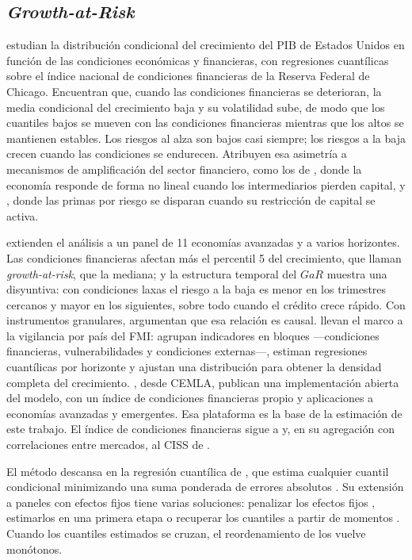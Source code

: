 \subsection{\textit{Growth-at-Risk}}

\citet{ABG2019b} estudian la distribución condicional del crecimiento del PIB de Estados Unidos en función de las condiciones económicas y financieras, con regresiones cuantílicas sobre el índice nacional de condiciones financieras de la Reserva Federal de Chicago. Encuentran que, cuando las condiciones financieras se deterioran, la media condicional del crecimiento baja y su volatilidad sube, de modo que los cuantiles bajos se mueven con las condiciones financieras mientras que los altos se mantienen estables. Los riesgos al alza son bajos casi siempre; los riesgos a la baja crecen cuando las condiciones se endurecen. Atribuyen esa asimetría a mecanismos de amplificación del sector financiero, como los de \citet{BrunnermeierSannikov2014}, donde la economía responde de forma no lineal cuando los intermediarios pierden capital, y \citet{HeKrishnamurthy2013}, donde las primas por riesgo se disparan cuando su restricción de capital se activa.

\citet{AdrianEtAl2022} extienden el análisis a un panel de 11 economías avanzadas y a varios horizontes. Las condiciones financieras afectan más el percentil 5 del crecimiento, que llaman \textit{growth-at-risk}, que la mediana; y la estructura temporal del $GaR$ muestra una disyuntiva: con condiciones laxas el riesgo a la baja es menor en los trimestres cercanos y mayor en los siguientes, sobre todo cuando el crédito crece rápido. Con instrumentos granulares, argumentan que esa relación es causal. \citet{PrasadEtAl2019} llevan el marco a la vigilancia por país del FMI: agrupan indicadores en bloques ---condiciones financieras, vulnerabilidades y condiciones externas---, estiman regresiones cuantílicas por horizonte y ajustan una distribución para obtener la densidad completa del crecimiento. \citet{OssandonBusch2022}, desde CEMLA, publican una implementación abierta del modelo, con un índice de condiciones financieras propio y aplicaciones a economías avanzadas y emergentes. Esa plataforma es la base de la estimación de este trabajo. El índice de condiciones financieras sigue a \citet{HatziusEtAl2010} y, en su agregación con correlaciones entre mercados, al CISS de \citet{HolloKremerLoDuca2012}.

El método descansa en la regresión cuantílica de \citet{KoenkerBassett1978}, que estima cualquier cuantil condicional minimizando una suma ponderada de errores absolutos \citep{Koenker2005}. Su extensión a paneles con efectos fijos tiene varias soluciones: penalizar los efectos fijos \citep{Koenker2004}, estimarlos en una primera etapa \citep{Canay2011} o recuperar los cuantiles a partir de momentos \citep{MachadoSantosSilva2019}. Cuando los cuantiles estimados se cruzan, el reordenamiento de \citet{ChernozhukovEtAl2010} los vuelve monótonos.


